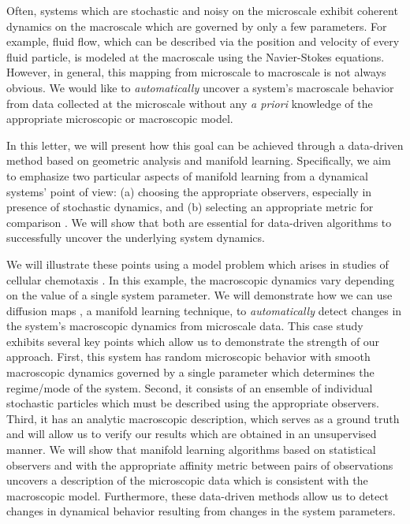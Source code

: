 \documentclass[prl, reprint]{revtex4-1}
\begin{document}
Often, systems which are stochastic and noisy on the microscale exhibit coherent dynamics on the macroscale which are governed by only a few parameters.
%
For example, fluid flow, which can be described via the position and velocity of every fluid particle, is modeled at the macroscale using the Navier-Stokes equations.
%
However, in general, this mapping from microscale to macroscale is not always obvious.
%
We would like to {\em automatically} uncover a system's macroscale behavior from data collected at the microscale without any {\em a priori} knowledge of the appropriate microscopic or macroscopic model.

In this letter, we will present how this goal can be achieved through a data-driven method based on geometric analysis and manifold learning. 
%
Specifically, we aim to emphasize two particular aspects of manifold learning from a dynamical systems' point of view: (a) choosing the appropriate observers, especially in presence of stochastic dynamics, and (b) selecting an appropriate metric for comparison \cite{mallat2012group}. 
%
We will show that both are essential for data-driven algorithms to successfully uncover the underlying system dynamics. 

We will illustrate these points using a model problem which arises in studies of cellular chemotaxis \cite{othmer2000diffusion}.
%
In this example, the macroscopic dynamics vary depending on the value of a single system parameter.
%
We will demonstrate how we can use diffusion maps \cite{coifman2005geometric}, a manifold learning technique, to {\em automatically} detect changes in the system's macroscopic dynamics from microscale data.
%
This case study exhibits several key points which allow us to demonstrate the strength of our approach.
%
First, this system has random microscopic behavior with smooth macroscopic dynamics governed by a single parameter which determines the regime/mode of the system. 
%
Second, it consists of an ensemble of individual stochastic particles which must be described using the appropriate observers.
%
Third, it has an analytic macroscopic description, which serves as a ground truth and will allow us to verify our results which are obtained in an unsupervised manner.
%
We will show that manifold learning algorithms based on statistical observers and with the appropriate affinity metric between pairs of observations uncovers a description of the microscopic data which is consistent with the macroscopic model.
%
Furthermore, these data-driven methods allow us to detect changes in dynamical behavior resulting from changes in the system parameters. 
\end{document}
